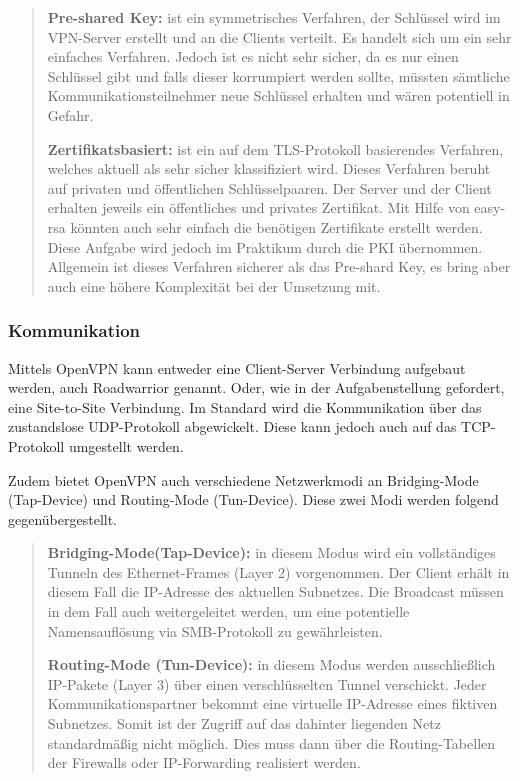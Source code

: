 \documentclass[
a4paper,     %
 headsepline, %
footsepline, %
titlepage,   %
 halfparskip,     %
 fleqn,       %
12pt         %
]{scrartcl}  %
\begin{document}
\begin{quotation}
\item[\textbf{Pre-shared Key:}]
ist ein symmetrisches Verfahren, der Schlüssel wird im VPN-Server erstellt und an die Clients verteilt. Es handelt sich um ein sehr einfaches Verfahren. Jedoch ist es nicht sehr sicher, da es nur einen Schlüssel gibt und falls dieser korrumpiert werden sollte, müssten sämtliche Kommunikationsteilnehmer neue Schlüssel erhalten und wären potentiell in Gefahr\cite{openV-1}. 

\item[\textbf{Zertifikatsbasiert:}]
ist ein auf dem TLS-Protokoll basierendes Verfahren, welches aktuell als sehr sicher klassifiziert wird. Dieses Verfahren beruht auf privaten und öffentlichen Schlüsselpaaren. Der Server und der Client erhalten jeweils ein öffentliches und privates Zertifikat. Mit Hilfe von easy-rsa könnten auch sehr einfach die benötigen Zertifikate erstellt werden. Diese Aufgabe wird jedoch im Praktikum durch die PKI übernommen. Allgemein ist dieses Verfahren sicherer als das Pre-shard Key, es bring aber auch eine höhere Komplexität bei der Umsetzung mit\cite{openV-1}. 
\end{quotation} 

\subsubsection{Kommunikation}

Mittels OpenVPN kann entweder eine Client-Server Verbindung aufgebaut werden, auch Roadwarrior genannt. Oder, wie in der Aufgabenstellung gefordert, eine Site-to-Site Verbindung. Im Standard wird die Kommunikation über das zustandslose UDP-Protokoll abgewickelt. Diese kann jedoch auch auf das TCP-Protokoll umgestellt werden\cite{openV-1}. 

Zudem bietet OpenVPN auch verschiedene Netzwerkmodi an Bridging-Mode (Tap-Device) und Routing-Mode (Tun-Device). 
Diese zwei Modi werden folgend gegenübergestellt. 

\begin{quotation}
\item[\textbf{Bridging-Mode(Tap-Device):}]
in diesem Modus wird ein vollständiges Tunneln des Ethernet-Frames (Layer 2) vorgenommen. Der Client erhält in diesem Fall die IP-Adresse des aktuellen Subnetzes. Die Broadcast müssen in dem Fall auch weitergeleitet werden, um eine potentielle Namensauflösung via SMB-Protokoll zu gewährleisten\cite{openV-1}.

\item[\textbf{Routing-Mode (Tun-Device):}]
in diesem Modus werden ausschließlich IP-Pakete (Layer 3) über einen verschlüsselten Tunnel verschickt. Jeder Kommunikationspartner bekommt eine virtuelle IP-Adresse eines fiktiven Subnetzes. Somit ist der Zugriff auf das dahinter liegenden Netz standardmäßig nicht möglich. Dies muss dann über die Routing-Tabellen der Firewalls  oder IP-Forwarding realisiert werden\cite{openV-1}.
\end{quotation}
\end{document}
